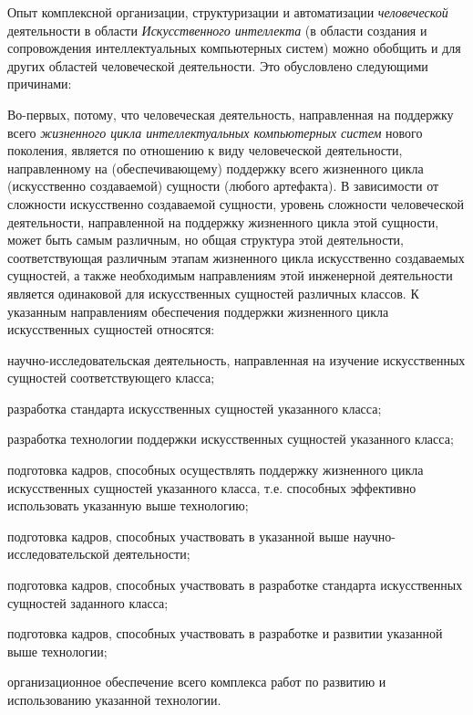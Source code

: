 Опыт комплексной организации, структуризации и автоматизации \textit{человеческой} деятельности в области \textit{Искусственного интеллекта} (в области создания и сопровождения интеллектуальных компьютерных систем) можно обобщить и для других областей человеческой деятельности. Это обусловлено следующими причинами:

\begin{textitemize}
	\item
	Во-первых, потому, что человеческая деятельность, направленная на поддержку всего \textit{жизненного цикла интеллектуальных компьютерных систем} нового поколения, является   по отношению к виду человеческой деятельности, направленному на (обеспечивающему) поддержку всего жизненного цикла  (искусственно создаваемой) сущности (любого артефакта). В зависимости от сложности искусственно создаваемой сущности, уровень сложности человеческой деятельности, направленной на поддержку жизненного цикла этой сущности, может быть самым различным, но общая структура этой деятельности, соответствующая различным этапам жизненного цикла искусственно создаваемых сущностей, а также необходимым направлениям  этой инженерной деятельности является одинаковой для искусственных сущностей различных классов. К указанным направлениям обеспечения поддержки жизненного цикла искусственных сущностей относятся:
	\begin{textitemize}
		\item научно-исследовательская деятельность, направленная на изучение искусственных сущностей соответствующего класса;
		\item разработка стандарта искусственных сущностей указанного класса;
		\item разработка технологии поддержки искусственных сущностей указанного класса;
		\item подготовка кадров, способных осуществлять поддержку жизненного цикла искусственных сущностей указанного класса, т.е. способных эффективно использовать указанную выше технологию;
		\item подготовка кадров, способных участвовать в указанной выше научно-исследовательской деятельности;
		\item подготовка кадров, способных участвовать в разработке стандарта искусственных сущностей заданного класса;
		\item подготовка кадров, способных участвовать в разработке и развитии указанной выше технологии;
		\item организационное обеспечение всего комплекса работ по развитию и использованию указанной технологии.
	\end{textitemize}
	

\end{textitemize}
